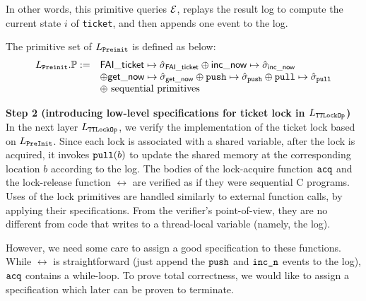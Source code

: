 {In other words, this primitive queries $\mathcal{E}$, replays the result log to
compute the current state $i$ of {\tt ticket},
and then appends one
 event to the log. 
The primitive set of $L_{\texttt{Preinit}}$ is defined as below:
\[
\begin{array}{rl}
L_{\texttt{Preinit}}.\mathbb{P} := &\mathsf{FAI\_ticket} \mapsto \hat{\sigma}_{\mathsf{FAI\_ticket}}
\oplus \mathsf{inc\_now} \mapsto \hat{\sigma}_{\mathsf{inc\_now}} \\
&\oplus \mathsf{get\_now} \mapsto \hat{\sigma}_{\mathsf{get\_now}}\oplus  {\texttt{push}}\mapsto \hat{\sigma}_{{\texttt{push}}}
\oplus  {\texttt{pull}}\mapsto \hat{\sigma}_{{\texttt{pull}}}\\
& \oplus  \text{ sequential primitives}
\end{array}
\]%

\noindent\textbf{Step 2 (introducing low-level specifications for ticket lock in $L_{\texttt{TTLockOp}}$)}
In the next layer $L_{\texttt{TTLockOp}}$, 
we verify the implementation of the ticket lock based on
 $L_{\texttt{PreInit}}$. Since each lock is associated with a shared variable,
after the lock is acquired, it invokes ${\texttt{pull}}(b)$ 
to update the shared memory at the corresponding location $b$
according to the log.
The bodies of the lock-acquire function ${\texttt{acq}}$ and 
the lock-release function $\rel$ are verified as if they were 
sequential C programs. Uses of the lock primitives are handled
similarly to external function calls, by applying their
specifications. From the verifier's point-of-view, they are no 
different from code
that writes to a thread-local variable (namely, the log). 

However, we need some care to assign a good specification to these
functions. While $\rel$ is straightforward (just append the
${\texttt{push}}$ and ${\texttt{inc\_n}}$ events to the log), 
${\texttt{acq}}$ contains a while-loop. To prove total correctness,
we would like to assign a specification which later can be proven
to terminate.

}

